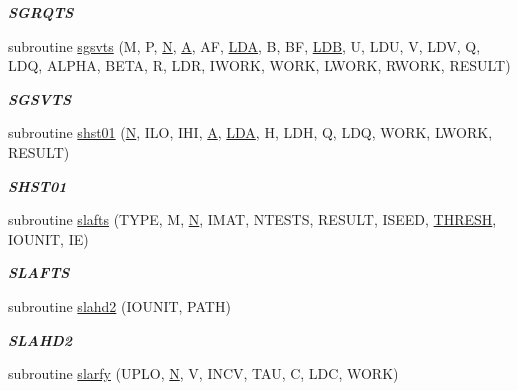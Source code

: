 \begin{DoxyCompactItemize}
\begin{DoxyCompactList}\small\item\em {\bfseries S\+G\+R\+Q\+T\+S} \end{DoxyCompactList}\item 
subroutine \hyperlink{group__single__eig_ga7832a2929b4429ee218f59c00dab4956}{sgsvts} (M, P, \hyperlink{polmisc_8c_a0240ac851181b84ac374872dc5434ee4}{N}, \hyperlink{classA}{A}, A\+F, \hyperlink{example__user_8c_ae946da542ce0db94dced19b2ecefd1aa}{L\+D\+A}, B, B\+F, \hyperlink{example__user_8c_a50e90a7104df172b5a89a06c47fcca04}{L\+D\+B}, U, L\+D\+U, V, L\+D\+V, Q, L\+D\+Q, A\+L\+P\+H\+A, B\+E\+T\+A, R, L\+D\+R, I\+W\+O\+R\+K, W\+O\+R\+K, L\+W\+O\+R\+K, R\+W\+O\+R\+K, R\+E\+S\+U\+L\+T)
\begin{DoxyCompactList}\small\item\em {\bfseries S\+G\+S\+V\+T\+S} \end{DoxyCompactList}\item 
subroutine \hyperlink{group__single__eig_gac3cc6f97fd6bdc607aab5f8bd0034054}{shst01} (\hyperlink{polmisc_8c_a0240ac851181b84ac374872dc5434ee4}{N}, I\+L\+O, I\+H\+I, \hyperlink{classA}{A}, \hyperlink{example__user_8c_ae946da542ce0db94dced19b2ecefd1aa}{L\+D\+A}, H, L\+D\+H, Q, L\+D\+Q, W\+O\+R\+K, L\+W\+O\+R\+K, R\+E\+S\+U\+L\+T)
\begin{DoxyCompactList}\small\item\em {\bfseries S\+H\+S\+T01} \end{DoxyCompactList}\item 
subroutine \hyperlink{group__single__eig_gac380bedffc2273fb83d72d857a28876a}{slafts} (T\+Y\+P\+E, M, \hyperlink{polmisc_8c_a0240ac851181b84ac374872dc5434ee4}{N}, I\+M\+A\+T, N\+T\+E\+S\+T\+S, R\+E\+S\+U\+L\+T, I\+S\+E\+E\+D, \hyperlink{zlaqgs_8c_a0656018abfc9fa2821827415f5d5ea57}{T\+H\+R\+E\+S\+H}, I\+O\+U\+N\+I\+T, I\+E)
\begin{DoxyCompactList}\small\item\em {\bfseries S\+L\+A\+F\+T\+S} \end{DoxyCompactList}\item 
subroutine \hyperlink{group__single__eig_gaed2b768a1738ac80fc4df77690614cd9}{slahd2} (I\+O\+U\+N\+I\+T, P\+A\+T\+H)
\begin{DoxyCompactList}\small\item\em {\bfseries S\+L\+A\+H\+D2} \end{DoxyCompactList}\item 
subroutine \hyperlink{group__single__eig_ga3cbcfa1d9632a6c7fbf5611dc86826ab}{slarfy} (U\+P\+L\+O, \hyperlink{polmisc_8c_a0240ac851181b84ac374872dc5434ee4}{N}, V, I\+N\+C\+V, T\+A\+U, C, L\+D\+C, W\+O\+R\+K)

\end{DoxyCompactItemize}
